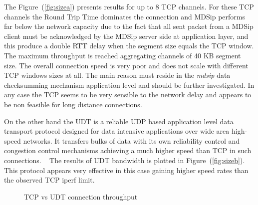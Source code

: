 \documentclass[10pt,a4paper]{article}
\begin{document}
The Figure~(\ref{fig:sizea}) presents results for up to 8 TCP channels. 
For these TCP channels the Round Trip Time dominates the connection and MDSip performs far below the network capacity due to the fact that all sent packet from a MDSip client must be acknowledged by the MDSip server side at application layer, and this produce a double RTT delay when the segment size equals the TCP window.
The maximum throughput is reached aggregating channels of 40 KB segment size.
The overall connection speed is very poor and does not scale with different TCP windows sizes at all.
The main reason must reside in the \emph{mdsip} data checksumming mechanism application level and should be further investigated.
In any case the TCP seems to be very sensible to the network delay and appears to be non feasible for long distance connections.

On the other hand the UDT is a reliable UDP based application level data transport protocol designed for data intensive applications over wide area high-speed networks. 
It transfers bulks of data with its own reliability control and congestion control mechanisms achieving a much higher speed than TCP in such connections.
~
The results of UDT bandwidth is plotted in Figure~(\ref{fig:sizeb}).
This protocol appears very effective in this case gaining higher speed rates than the observed TCP iperf limit.

\begin{figure}[ht]
\centerline{
}
\caption[]
{ TCP vs UDT connection throughput }
\label{fig:size}
\end{figure}
\end{document}
